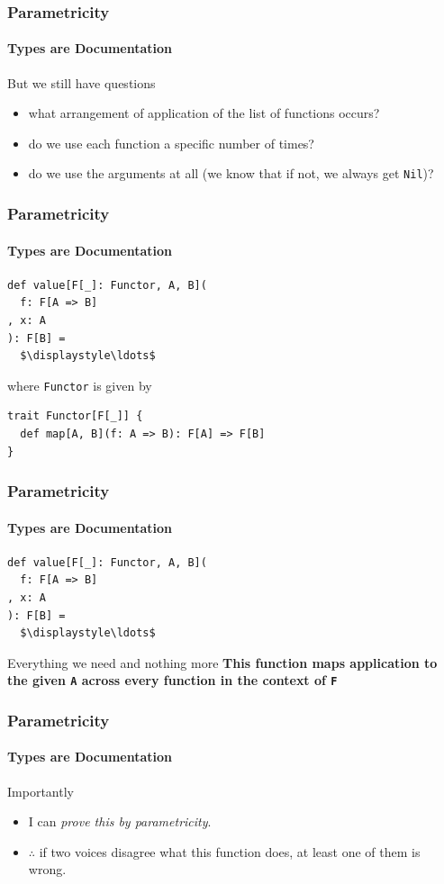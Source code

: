 \begin{frame}
\frametitle{Parametricity}
\framesubtitle{Types are Documentation}
\begin{block}{But we still have questions}
\begin{itemize}
  \item<1-> \tiny{what arrangement of application of the list of functions occurs?}
  \item<2-> \tiny{do we use each function a specific number of times?}
  \item<3-> \tiny{do we use the arguments at all (we know that if not, we always get \lstinline$Nil$)?}
\end{itemize}
\end{block}
\end{frame}


\begin{frame}[fragile]
\frametitle{Parametricity}
\framesubtitle{Types are Documentation}
\begin{lstlisting}[style=scala,mathescape]
def value[F[_]: Functor, A, B](
  f: F[A => B]
, x: A
): F[B] =
  $\displaystyle\ldots$
\end{lstlisting}
\begin{block}{where \lstinline$Functor$ is given by}
\begin{lstlisting}[style=scala]
trait Functor[F[_]] {
  def map[A, B](f: A => B): F[A] => F[B]
}
\end{lstlisting}
\end{block}
\end{frame}


\begin{frame}[fragile]
\frametitle{Parametricity}
\framesubtitle{Types are Documentation}
\begin{lstlisting}[style=scala,mathescape]
def value[F[_]: Functor, A, B](
  f: F[A => B]
, x: A
): F[B] =
  $\displaystyle\ldots$
\end{lstlisting}
\begin{block}{Everything we need and nothing more}
\textbf{This function maps application to the given \lstinline$A$ across every function in the context of \lstinline$F$}
\end{block}
\end{frame}


\begin{frame}[fragile]
\frametitle{Parametricity}
\framesubtitle{Types are Documentation}
\begin{block}{Importantly}
\begin{itemize}
  \item<1-> I can \emph{prove this by parametricity}.
  \item<2-> $\therefore$ if two voices disagree what this function does, at least one of them is wrong.
\end{itemize}
\end{block}
\end{frame}


